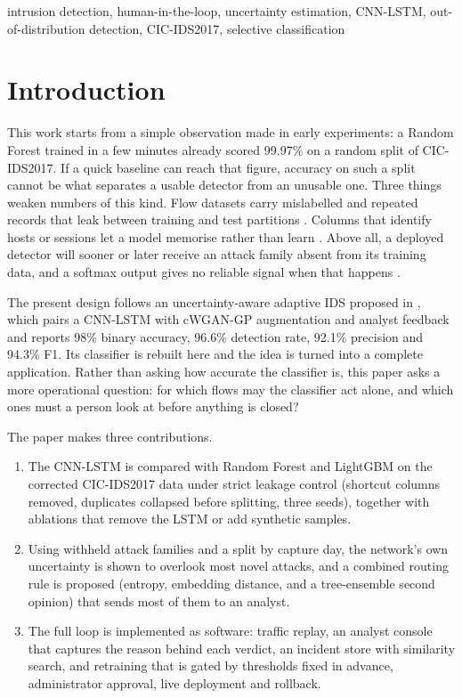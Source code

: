 \documentclass[conference]{IEEEtran}
\begin{document}
\begin{IEEEkeywords}
intrusion detection, human-in-the-loop, uncertainty estimation, CNN-LSTM, out-of-distribution detection, CIC-IDS2017, selective classification
\end{IEEEkeywords}

\section{Introduction}
This work starts from a simple observation made in early experiments: a Random Forest
trained in a few minutes already scored 99.97\% on a random split of CIC-IDS2017. If a quick
baseline can reach that figure, accuracy on such a split cannot be what separates a usable
detector from an unusable one. Three things weaken numbers of this kind. Flow datasets carry
mislabelled and repeated records that leak between training and test partitions
\cite{engelen2021troubleshooting,liu2022error}. Columns that identify hosts or sessions let a model
memorise rather than learn \cite{arp2022dos}. Above all, a deployed detector will sooner or later
receive an attack family absent from its training data, and a softmax output gives no reliable
signal when that happens \cite{sommer2010outside,hendrycks2017baseline}.

The present design follows an uncertainty-aware adaptive IDS proposed in \cite{refpaper2025}, which pairs
a CNN-LSTM with cWGAN-GP augmentation and analyst feedback and reports 98\% binary accuracy,
96.6\% detection rate, 92.1\% precision and 94.3\% F1. Its classifier is rebuilt here and the
idea is turned into a complete application. Rather than asking how accurate the classifier is, this paper asks a
more operational question: for which flows may the classifier act alone, and which ones must a
person look at before anything is closed?

The paper makes three contributions.
\begin{enumerate}
\item The CNN-LSTM is compared with Random Forest and LightGBM on the corrected CIC-IDS2017 data
under strict leakage control (shortcut columns removed, duplicates collapsed before splitting,
three seeds), together with ablations that remove the LSTM or add synthetic samples.
\item Using withheld attack families and a split by capture day, the network's own
uncertainty is shown to overlook most novel attacks, and a combined routing rule is proposed (entropy,
embedding distance, and a tree-ensemble second opinion) that sends most of them to an analyst.
\item The full loop is implemented as software: traffic replay, an analyst console that captures
the reason behind each verdict, an incident store with similarity search, and retraining that is
gated by thresholds fixed in advance, administrator approval, live deployment and rollback.
\end{enumerate}
\end{document}
